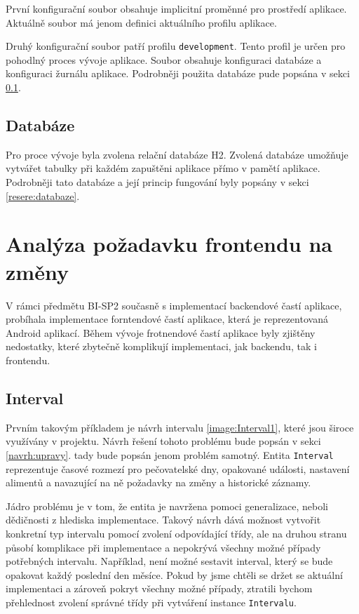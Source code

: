         První konfigurační soubor obsahuje implicitní proměnné pro prostředí aplikace. Aktuálně soubor má jenom definici aktuálního profilu aplikace. 
    
        Druhý konfigurační soubor patří profilu \texttt{development}. Tento profil je určen pro pohodlný proces vývoje aplikace. Soubor obsahuje konfiguraci databáze a konfiguraci žurnálu aplikace. Podrobněji použita databáze pude popsána v sekci \ref{analyza:soucasnaImplementace:databaze}.
        
    \subsection{Databáze}\label{analyza:soucasnaImplementace:databaze}
        Pro proce vývoje byla zvolena relační databáze H2. Zvolená databáze umožňuje vytvářet tabulky při každém zapuštěni aplikace přímo v pamětí aplikace. Podrobněji tato databáze a její princip fungování byly popsány v sekci \ref{resere:databaze}.
    
\section{Analýza požadavku frontendu na změny}\label{analyza:pozadavky-frontendu}
    V rámci předmětu BI-SP2 současně s implementací backendové častí aplikace, probíhala implementace forntendové častí aplikace, která je reprezentovaná Android aplikací. Během vývoje frotnendové častí aplikace byly zjištěny nedostatky, které zbytečně komplikují implementaci, jak backendu, tak i frontendu.
    
    \subsection{Interval}
        Prvním takovým příkladem je návrh intervalu \ref{image:Interval1}, které jsou široce využívány v projektu. Návrh řešení tohoto problému bude popsán v sekci \ref{navrh:upravy}. tady bude popsán jenom problém samotný. Entita \texttt{Interval} reprezentuje časové rozmezí pro pečovatelské dny, opakované události, nastavení alimentů a navazující na ně požadavky na změny a historické záznamy.
            
        Jádro problému je v tom, že entita je navržena pomoci generalizace, neboli dědičnosti z hlediska implementace. Takový návrh dává možnost vytvořit konkretní typ intervalu pomocí zvolení odpovídající třídy, ale na druhou stranu působí komplikace při implementace a nepokrývá všechny možné případy potřebných intervalu. Například, není možné sestavit interval, který se bude opakovat každý poslední den měsíce. Pokud by jsme chtěli se držet se aktuální implementaci a zároveň pokryt všechny možné případy, ztratili bychom přehlednost zvolení správné třídy při vytváření instance \texttt{Intervalu}.
            

